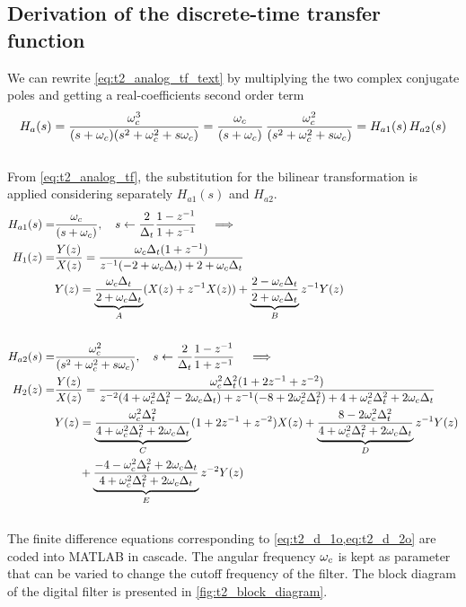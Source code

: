 \subsection{Derivation of the discrete-time transfer function}
We can rewrite \cref{eq:t2_analog_tf_text} by multiplying the two complex conjugate poles and getting a real-coefficients second order term
\begin{equation}\label{eq:t2_analog_tf}
H_a(s)=\frac{\omega_c^3}{(s+\omega_c)(s^2+\omega_c^2+s\omega_c)}=\dfrac{\omega_c}{(s+\omega_c)}\,\dfrac{\omega_c^2}{(s^2+\omega_c^2+s\omega_c)}=H_{a1}(s)\, H_{a2}(s)
\end{equation}
\\
From \cref{eq:t2_analog_tf}, the substitution for the bilinear transformation is applied considering separately $H_{a1}(s)$ and $H_{a2}$.
\begin{align}
H_{a1}(s)=&\dfrac{\omega_c}{(s+\omega_c)}, \quad s\leftarrow \frac{2}{\Delta_t}\frac{1-z^{-1}}{1+z^{-1}} \quad \implies \nonumber \\
H_1(z)=&\frac{Y(z)}{X(z)}=\frac{\omega_c\Delta_t (1+z^{-1})}{z^{-1}(-2+\omega_c\Delta_t)+2+\omega_c\Delta_t} \label{eq:t2_h1} \\
&Y(z)=\underbrace{\frac{\omega_c\Delta_t}{2+\omega_c\Delta_t}}_{A}  (X(z)+z^{-1} X(z))+\underbrace{\frac{2-\omega_c \Delta_t}{2+\omega_c \Delta_t}}_{B} z^{-1} Y(z) \label{eq:t2_d_1o} \\
\nonumber\\
H_{a2}(s)=&\dfrac{\omega_c^2}{(s^2+\omega_c^2+s\omega_c)}, \quad s\leftarrow \frac{2}{\Delta_t}\frac{1-z^{-1}}{1+z^{-1}} \quad \implies \nonumber \\
H_2(z)=&\frac{Y(z)}{X(z)}= \frac{\omega_c^2\Delta_t^2(1+2z^{-1}+z^{-2})}{z^{-2} (4+\omega_c^2 \Delta_t^2-2\omega_c\Delta_t)+ z^{-1} (-8+2\omega_c^2\Delta_t^2)+4+\omega_c^2\Delta_t^2+2\omega_c\Delta_t} \label{eq:t2_h2}  \\
&\begin{aligned}
Y(z)&=\underbrace{\frac{\omega_c^2 \Delta_t^2}{4+\omega_c^2 \Delta_t^2+2\omega_c\Delta_t}}_{C}(1+ 2 z^{-1} +z^{-2}) X(z) +\underbrace{\frac{8-2\omega_c^2\Delta_t^2}{4+\omega_c^2\Delta_t^2+2\omega_c\Delta_t}}_{D} z^{-1} Y(z)\\
&+\underbrace{\frac{-4-\omega_c^2\Delta_t^2+2\omega_c\Delta_t}{4+\omega_c^2\Delta_t^2+2\omega_c\Delta_t}}_{E} z^{-2} Y(z) \label{eq:t2_d_2o}
\end{aligned}
\end{align}
\\
The finite difference equations corresponding to \cref{eq:t2_d_1o,eq:t2_d_2o} are coded into MATLAB in cascade. The angular frequency $\omega_c$ is kept as parameter that can be varied to change the cutoff frequency of the filter. The block diagram of the digital filter is presented in \cref{fig:t2_block_diagram}.
